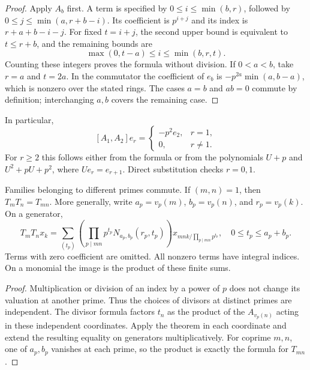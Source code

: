 \begin{proof}
Apply \(A_b\) first. A term is specified by
\(0\le i\le\min(b,r)\), followed by
\(0\le j\le\min(a,r+b-i)\). Its coefficient is \(p^{i+j}\) and
its index is \(r+a+b-i-j\). For fixed \(t=i+j\), the second upper
bound is equivalent to \(t\le r+b\), and the remaining bounds are
\[
 \max(0,t-a)\le i\le\min(b,r,t).
\]
Counting these integers proves the formula without division.
If \(0<a<b\), take \(r=a\) and \(t=2a\). In the commutator the
coefficient of \(e_b\) is
\(-p^{2a}\min(a,b-a)\), which is nonzero over the stated rings.
The cases \(a=b\) and \(ab=0\) commute by definition; interchanging
\(a,b\) covers the remaining case.
\end{proof}

In particular,
\begin{equation}
\label{v4-arith:ado:first-commutator}
 [A_1,A_2]e_r=
 \begin{cases}-p^2 e_2,&r=1,\\0,&r\ne1.\end{cases}
\end{equation}
For \(r\ge2\) this follows either from the formula or from the
polynomials \(U+p\) and \(U^2+pU+p^2\), where \(Ue_r=e_{r+1}\).
Direct substitution checks \(r=0,1\).

\begin{corollary}
\label{v4-arith:ado:global-composition}
Families belonging to different primes commute. If \((m,n)=1\),
then \(T_mT_n=T_{mn}\). More generally, write
\(a_p=v_p(m)\), \(b_p=v_p(n)\), and \(r_p=v_p(k)\). On a generator,
\begin{equation}
\label{v4-arith:ado:global-formula}
 T_mT_n x_k=
 \sum_{(t_p)}
 \left(\prod_{p\mid mn}p^{t_p}N_{a_p,b_p}(r_p,t_p)\right)
 x_{mnk/\prod_{p\mid mn}p^{t_p}},
 \quad 0\le t_p\le a_p+b_p.
\end{equation}
Terms with zero coefficient are omitted. All nonzero terms have integral
indices. On a monomial the image is the product of these finite sums.
\end{corollary}

\begin{proof}
Multiplication or division of an index by a power of \(p\) does not change
its valuation at another prime. Thus the choices of divisors at distinct
primes are independent. The divisor formula factors \(t_n\) as the product
of the \(A_{v_p(n)}\) acting in these independent coordinates. Apply the
theorem in each coordinate and extend the resulting equality on generators
multiplicatively. For coprime \(m,n\), one of \(a_p,b_p\) vanishes at each
prime, so the product is exactly the formula for \(T_{mn}\).
\end{proof}


